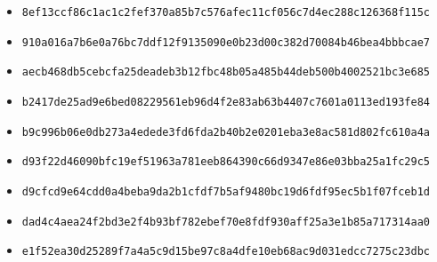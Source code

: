 {\begin{itemize}
    \item \texttt{8ef13ccf86c1ac1c2fef370a85b7c576afec11cf056c7d4ec288c126368f115c}
    \item \texttt{910a016a7b6e0a76bc7ddf12f9135090e0b23d00c382d70084b46bea4bbbcae7}
    \item \texttt{aecb468db5cebcfa25deadeb3b12fbc48b05a485b44deb500b4002521bc3e685}
    \item \texttt{b2417de25ad9e6bed08229561eb96d4f2e83ab63b4407c7601a0113ed193fe84}
    \item \texttt{b9c996b06e0db273a4edede3fd6fda2b40b2e0201eba3e8ac581d802fc610a4a}
    \item \texttt{d93f22d46090bfc19ef51963a781eeb864390c66d9347e86e03bba25a1fc29c5}
    \item \texttt{d9cfcd9e64cdd0a4beba9da2b1cfdf7b5af9480bc19d6fdf95ec5b1f07fceb1d}
    \item \texttt{dad4c4aea24f2bd3e2f4b93bf782ebef70e8fdf930aff25a3e1b85a717314aa0}
    \item \texttt{e1f52ea30d25289f7a4a5c9d15be97c8a4dfe10eb68ac9d031edcc7275c23dbc}
\end{itemize}
}
